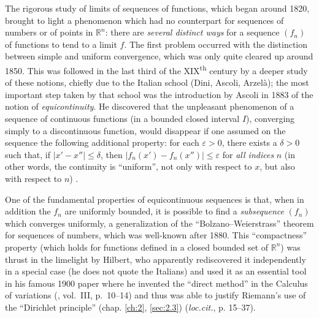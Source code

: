 \documentclass[12pt,a4paper,leqno,twoside]{extbook}
\newcommand{\supth}{\texorpdfstring{\textsuperscript{th}}{th}}
\newcommand{\R}{\mathbb{R}}
\begin{document}
The rigorous study of limits of sequences of functions, which began around 1820, brought to light a phenomenon which had no counterpart for sequences of numbers or of points in \(\R^n\): there are \emph{several distinct ways} for a sequence \((f_n)\) of functions to tend to a limit \(f\). The first problem occurred with the distinction between simple and uniform convergence, which was only quite cleared up around 1850. This was followed in the last third of the XIX\supth{} century by a deeper study of these notions, chiefly due to the Italian school (Dini, Ascoli, Arzelà); the most important step taken by that school was the introduction by Ascoli in 1883 of the notion of \emph{equicontinuity}. He discovered that the unpleasant phenomenon of a sequence of continuous functions (in a bounded closed interval \(I\)), converging simply to a discontinuous function, would disappear if one assumed on the sequence the following additional property: for each \(\varepsilon > 0\), there exists a \(\delta > 0\) such that, if \(|x'-x''| \leq \delta\), then \(|f_n(x') - f_n(x'')| \leq \varepsilon\) for \emph{all indices} \(n\) (in other words, the continuity is ``uniform'', not only with respect to \(x\), but also with respect to \(n\)) \cite{008}.

One of the fundamental properties of equicontinuous sequences is that, when in addition the \(f_n\) are uniformly bounded, it is possible to find a \emph{subsequence} \((f_n)\) which converges uniformly, a generalization of the ``Bolzano--Weierstrass'' theorem for sequences of numbers, which was well-known after 1880. This ``compactness'' property (which holds for functions defined in a closed bounded set of \(\R^n\)) was thrust in the limelight by Hilbert, who apparently rediscovered it independently in a special case (he does not quote the Italians) and used it as an essential tool in his famous 1900 paper where he invented the ``direct method'' in the Calculus of variations (\cite{111}, vol.~III, p.~10--14) and thus was able to justify Riemann's use of the ``Dirichlet principle'' (chap. \ref{ch:2}, \ref{sec:2.3}) (\emph{loc.cit.}, p. 15--37).
\end{document}
